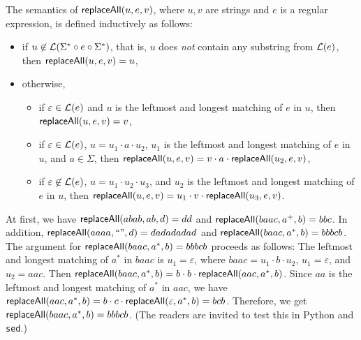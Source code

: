 \begin{definition} \label{def:replaceall}
The semantics of $\mathsf{replaceAll}(u, e, v)$, where $u, v$ are strings and $e$ is a regular expression, is defined inductively as follows:
\begin{itemize}
%	
%
	\item if $u \not \in \mathcal{L}(\Sigma^\ast \circ e \circ \Sigma^\ast)$, that is, $u$ does \emph{not} contain any substring from $\mathcal{L}(e)$, then $\mathsf{replaceAll}(u, e, v) = u$, 
	\item otherwise, 
	\begin{itemize}
	\item if $\varepsilon \in \mathcal{L}(e)$ and $u$ is the leftmost and longest matching of $e$ in $u$, then $\mathsf{replaceAll}(u, e, v) = v$,
	\item if $\varepsilon \in \mathcal{L}(e)$, $u = u_1 \cdot  a \cdot  u_2$, $u_1$ is the leftmost and longest matching of $e$ in $u$, and $a \in \Sigma$, then $\mathsf{replaceAll}(u, e, v) = v \cdot a \cdot \mathsf{replaceAll}(u_2, e, v)$,
	\item if $\varepsilon \not \in \mathcal{L}(e)$, $u = u_1\cdot  u_2\cdot  u_3$, and $u_2$ is the leftmost and longest matching of $e$ in $u$,  then 
$\mathsf{replaceAll}(u, e, v) = u_1 \cdot v \cdot \mathsf{replaceAll}(u_3, e, v)$. 
	\end{itemize}
\end{itemize}
\end{definition}



\begin{example}
	
At first, we have $\mathsf{replaceAll}(abab, ab, d) =dd$ and $\mathsf{replaceAll}(baac, a^+, b)=bbc$. In addition, $\mathsf{replaceAll}(aaaa, ``", d) =dadadadad$ and $\mathsf{replaceAll}(baac, a^*, b) =bbbcb$.  The argument for $\mathsf{replaceAll}(baac, a^*, b) = bbbcb$ proceeds as follows: The leftmost and longest matching of $a^*$ in $baac$ is $u_1 =\varepsilon$, where $baac = u_1 \cdot b \cdot u_2$, $u_1 = \varepsilon$, and $u_2 = aac$. Then $\mathsf{replaceAll}(baac, a^*, b) = b \cdot b \cdot \mathsf{replaceAll}(aac, a^*, b)$. Since $aa$ is the leftmost and longest matching of $a^*$ in $aac$, we have $\mathsf{replaceAll}(aac, a^*, b) = b \cdot c \cdot \mathsf{replaceAll}(\varepsilon, a^*, b) = bcb$. Therefore, we get $\mathsf{replaceAll}(baac, a^*, b) = bbbcb$. (The readers are invited to test this in Python and \texttt{sed}.)


\end{example}

